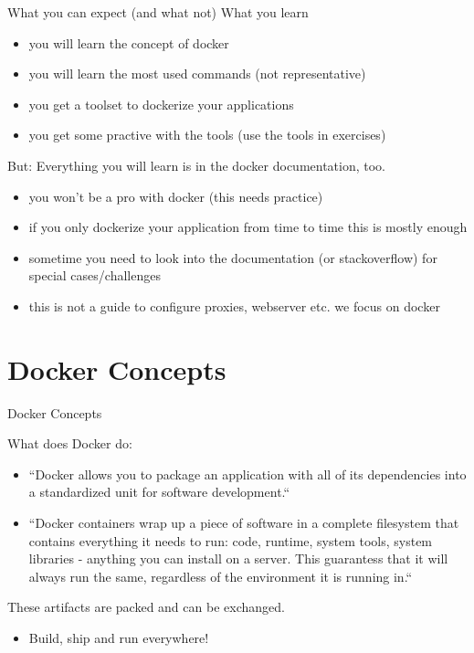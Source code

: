 \documentclass[10pt,aspectratio=\ratio,
compress
]{beamer}
\newcommand\meta{./meta}
\begin{document}
\begin{frame}{What you can expect (and what not)}
What you learn
\begin{itemize}
	\item you will learn the concept of docker
	\item you will learn the most used commands (not representative)
	\item you get a toolset to dockerize your applications
	\item you get some practive with the tools (use the tools in exercises)
\end{itemize}
But: Everything you will learn  is in the docker documentation, too.
\begin{itemize}
	\item you won't be a pro with docker (this needs practice)
	\item if you only dockerize your application from time to time this is mostly enough
	\item sometime you need to look into the documentation (or stackoverflow) for special cases/challenges
	\item this is not a guide to configure proxies, webserver etc. we focus on docker
\end{itemize}

\end{frame}
\section{Docker Concepts}
\begin{frame}{Docker Concepts}

What does Docker do:
\begin{itemize}
	\item ``Docker allows you to package an application with all of its dependencies into a standardized unit for software development.``
	\item ``Docker containers wrap up a piece of software in a complete filesystem that contains everything it needs to run: code, runtime, system tools, system libraries - anything you can install on a server. This guarantess that it will always run the same, regardless of the environment it is running in.``
\end{itemize}
These artifacts are packed and can be exchanged.
\begin{itemize}
\item Build, ship and run everywhere!
\end{itemize}
\end{frame}
\end{document}
